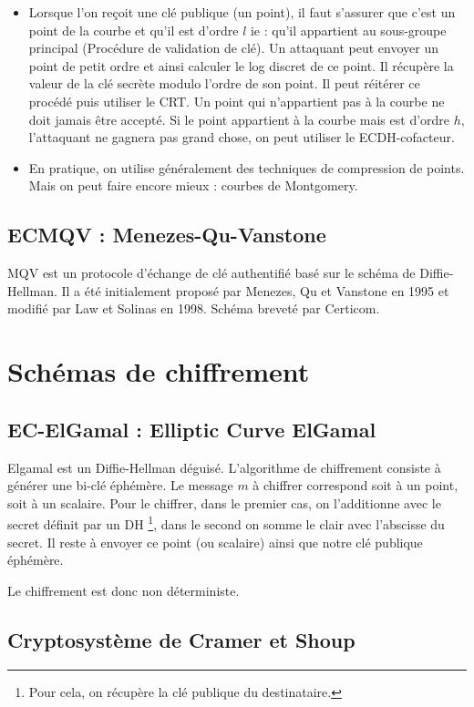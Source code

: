 \begin{itemize}[label=$\bullet$]
    \item Lorsque l'on reçoit une clé publique (un point), il faut s'assurer que c'est un point de la courbe et qu'il est d'ordre $l$ ie : qu'il appartient au sous-groupe principal (Procédure de validation de clé). Un attaquant peut envoyer un point de petit ordre et ainsi calculer le log discret de ce point. Il récupère la valeur de la clé secrète modulo l'ordre de son point. Il peut réitérer ce procédé puis utiliser le CRT. Un point qui n'appartient pas à la courbe ne doit jamais être accepté. Si le point appartient à la courbe mais est d'ordre $h$, l'attaquant ne gagnera pas grand chose, on peut utiliser le ECDH-cofacteur. 
    
    \item En pratique, on utilise généralement des techniques de compression de points. Mais on peut faire encore mieux : courbes de Montgomery.
\end{itemize}

\subsection{ECMQV : Menezes-Qu-Vanstone}
MQV est un protocole d'échange de clé authentifié basé sur le schéma de Diffie-Hellman. Il a été initialement proposé par Menezes, Qu et Vanstone en 1995 et modifié par Law et Solinas en 1998. Schéma breveté par Certicom.

\section{Schémas de chiffrement}
\subsection{EC-ElGamal : Elliptic Curve ElGamal}
Elgamal est un Diffie-Hellman déguisé. L'algorithme de chiffrement consiste à générer une bi-clé éphémère. Le message $m$ à chiffrer correspond soit à un point, soit à un scalaire. Pour le chiffrer, dans le premier cas, on l'additionne avec le secret définit par un DH \footnote{Pour cela, on récupère la clé publique du destinataire.}, dans le second on somme le clair avec l'abscisse du secret. Il reste à envoyer ce point (ou scalaire) ainsi que notre clé publique éphémère.

Le chiffrement est donc non déterministe.

\subsection{Cryptosystème de Cramer et Shoup}
